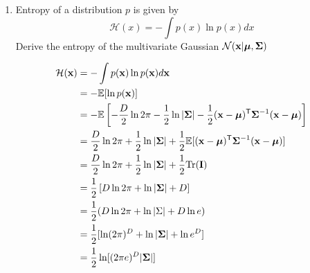 \documentclass{amsmlaj}
\begin{document}
\begin{problem}
\begin{enumerate}
\item Entropy of a distribution $p$ is given by
    \begin{equation}
    \mathcal{H}(x) = - \int {p(x)\ln p(x)} dx\nonumber
    \end{equation}
    Derive the entropy of the multivariate Gaussian $\mathcal{N}(\bm{\mathbf{x}}|\bm{\mathbf{\mu}},\bm{\mathbf{\Sigma}})$

	\begin{align}
		\mathcal{H}(\bm{\mathbf{x}}) &= - \int {p(\bm{\mathbf{x}})\ln p(\bm{\mathbf{x}})} d\bm{\mathbf{x}}\nonumber \\
		&=-\mathbb{E}[\ln p(\bm{\mathbf{x}})] \\
		&=-\mathbb{E}\left[
			-\frac{D}{2}\ln2\pi
			-\frac{1}{2}\ln|\bm{\mathbf{\Sigma}}|
			-\frac{1}{2}(\bm{\mathbf{x}}-\bm{\mathbf{\mu}})^{\mathsf{T}}\bm{\mathbf{\Sigma}}^{-1}(\bm{\mathbf{x}}-\bm{\mathbf{\mu}})
		\right] \\
		&=\frac{D}{2}\ln2\pi+\frac{1}{2}\ln|\bm{\mathbf{\Sigma}}|
		+\frac{1}{2}\mathbb{E}[(\bm{\mathbf{x}}-\bm{\mathbf{\mu}})^{\mathsf{T}}\bm{\mathbf{\Sigma}}^{-1}(\bm{\mathbf{x}}-\bm{\mathbf{\mu}})] \\
		&=\frac{D}{2}\ln2\pi+\frac{1}{2}\ln|\bm{\mathbf{\Sigma}}|+\frac{1}{2}\text{Tr}(\bm{\mathbf{I}}) \\
		&=\frac{1}{2}\left[ D\ln2\pi+\ln|\bm{\mathbf{\Sigma}}|+D \right] \\
		&=\frac{1}{2}(D\ln2\pi+\ln|\Sigma|+D\ln e) \\
		&=\frac{1}{2}[\ln(2\pi)^D+\ln|\bm{\mathbf{\Sigma}}|+\ln e^D] \\
		&=\frac{1}{2}\ln[(2\pi e)^D |\bm{\mathbf{\Sigma}}|]
	\end{align}

\end{enumerate}
\end{problem}
\end{document}
